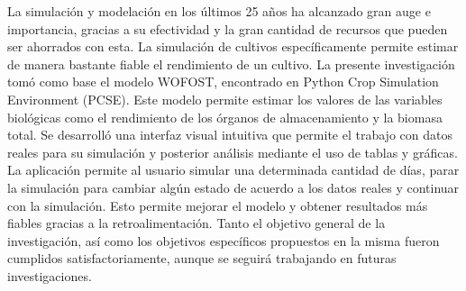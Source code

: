 \begin{conclusions}
    La simulación y modelación en los últimos 25 años ha alcanzado gran auge e importancia, gracias a su efectividad y la gran cantidad de recursos que pueden ser ahorrados con esta. La simulación de cultivos específicamente permite estimar de manera bastante fiable el rendimiento de un cultivo.
    La presente investigación tomó como base el modelo WOFOST, encontrado en Python Crop Simulation Environment (PCSE). Este modelo permite estimar los valores de las variables biológicas como el rendimiento de los órganos de almacenamiento y la biomasa total.
    Se desarrolló una interfaz visual intuitiva que permite el trabajo con datos reales para su simulación y posterior análisis mediante el uso de tablas y gráficas. La aplicación permite al usuario simular una determinada cantidad de días, parar la simulación para cambiar algún estado de acuerdo a los datos reales y continuar con la simulación. Esto permite mejorar el modelo y obtener resultados más fiables gracias a la retroalimentación.
    Tanto el objetivo general de la investigación, así como los objetivos específicos propuestos en la misma fueron cumplidos satisfactoriamente, aunque se seguirá trabajando en futuras investigaciones.
\end{conclusions}
